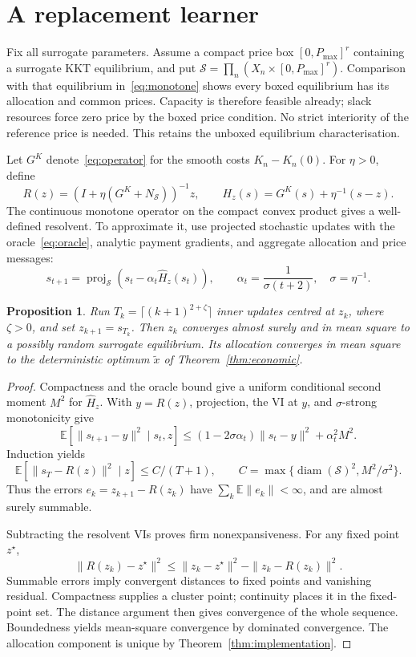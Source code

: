 \documentclass{article}
\newtheorem{proposition}[theorem]{Proposition}
\begin{document}
\section{A replacement learner}
Fix all surrogate parameters. Assume a compact price box
\([0,P_{\max}]^r\) containing a surrogate KKT equilibrium, and put
\(\mathcal S=\prod_n(X_n\times[0,P_{\max}]^r)\).
Comparison with that equilibrium in~\eqref{eq:monotone} shows every
boxed equilibrium has its allocation and common prices. Capacity is
therefore feasible already; slack resources force zero price by the
boxed price condition. No strict interiority of the reference price is
needed. This retains the unboxed equilibrium characterisation.

Let \(G^K\) denote~\eqref{eq:operator} for the smooth costs
\(K_n-K_n(0)\). For \(\eta>0\), define
\[
 R(z)=(I+\eta(G^K+N_{\mathcal S}))^{-1}z,
 \qquad H_z(s)=G^K(s)+\eta^{-1}(s-z).
\]
The continuous monotone operator on the compact convex product gives a
well-defined resolvent. To approximate it, use projected stochastic
updates with the oracle~\eqref{eq:oracle}, analytic payment gradients,
and aggregate allocation and price messages:
\[
 s_{t+1}=\operatorname{proj}_{\mathcal S}
 (s_t-\alpha_t\widehat H_z(s_t)),\qquad
 \alpha_t=\frac{1}{\sigma(t+2)},\quad \sigma=\eta^{-1}.
\]
\begin{proposition}\label{prop:learning}
Run \(T_k=\lceil(k+1)^{2+\zeta}\rceil\) inner updates centred at \(z_k\),
where \(\zeta>0\), and set \(z_{k+1}=s_{T_k}\). Then \(z_k\) converges
almost surely and in mean square to a possibly random surrogate equilibrium.
Its allocation converges in mean square to the deterministic optimum
\(\widetilde x\) of Theorem~\ref{thm:economic}.
\end{proposition}
\begin{proof}
Compactness and the oracle bound give a uniform conditional second moment
\(M^2\) for \(\widehat H_z\). With \(y=R(z)\), projection, the VI
at \(y\), and \(\sigma\)-strong monotonicity give
\[
 \mathbb E[\|s_{t+1}-y\|^2\mid s_t,z]
 \le(1-2\sigma\alpha_t)\|s_t-y\|^2+\alpha_t^2M^2.
\]
Induction yields
\[
 \mathbb E[\|s_T-R(z)\|^2\mid z]\le C/(T+1),\qquad
 C=\max\{\operatorname{diam}(\mathcal S)^2,M^2/\sigma^2\}.
\]
Thus the errors \(e_k=z_{k+1}-R(z_k)\) have
\(\sum_k\mathbb E\|e_k\|<\infty\), and are almost surely summable.

Subtracting the resolvent VIs proves firm nonexpansiveness. For any
fixed point \(z^\star\),
\[
 \|R(z_k)-z^\star\|^2\le\|z_k-z^\star\|^2-\|z_k-R(z_k)\|^2.
\]
Summable errors imply convergent distances to fixed points and vanishing
residual. Compactness supplies a cluster point; continuity places it in
the fixed-point set. The distance argument then gives convergence of the
whole sequence. Boundedness yields mean-square convergence by dominated
convergence. The allocation component is unique by
Theorem~\ref{thm:implementation}.
\end{proof}
\end{document}
